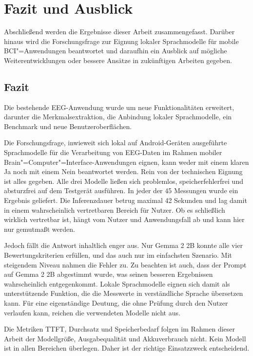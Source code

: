 \chapter{Fazit und Ausblick}
\label{ch:fazit}
Abschließend werden die Ergebnisse dieser Arbeit zusammengefasst. Darüber hinaus wird die Forschungsfrage zur Eignung lokaler Sprachmodelle für mobile \ac{BCI}"=Anwendungen beantwortet und daraufhin ein Ausblick auf mögliche Weiterentwicklungen oder bessere Ansätze in zukünftigen Arbeiten gegeben.

\section{Fazit}
\label{sec:fazit}
Die bestehende \ac{EEG}-Anwendung wurde um neue Funktionalitäten erweitert, darunter die Merkmalsextraktion, die Anbindung lokaler Sprachmodelle, ein Benchmark und neue Benutzeroberflächen.
\vspace{\baselineskip}

\noindent Die Forschungsfrage, inwieweit sich lokal auf Android-Geräten ausgeführte Sprachmodelle für die Verarbeitung von \ac{EEG}-Daten im Rahmen mobiler Brain"=Computer"=Interface-Anwendungen eignen, kann weder mit einem klaren Ja noch mit einem Nein beantwortet werden. Rein von der technischen Eignung ist alles gegeben. Alle drei Modelle ließen sich problemlos, speicherfehlerfrei und absturzfrei auf dem Testgerät ausführen. In jeder der 45 Messungen wurde ein Ergebnis geliefert. Die Inferenzdauer betrug maximal 42 Sekunden und lag damit in einem wahrscheinlich vertretbaren Bereich für Nutzer. Ob es schließlich wirklich vertretbar ist, hängt vom Nutzer und Anwendungsfall ab und kann hier nur gemutmaßt werden.
\vspace{\baselineskip}

\noindent Jedoch fällt die Antwort inhaltlich enger aus. Nur Gemma 2 2B konnte alle vier Bewertungskriterien erfüllen, und das auch nur im einfachsten Szenario. Mit steigendem Niveau nahmen die Fehler zu. Zu beachten ist auch, dass der Prompt auf Gemma 2 2B abgestimmt wurde, was seinen besseren Ergebnissen wahrscheinlich entgegenkommt. Lokale Sprachmodelle eignen sich damit als unterstützende Funktion, die die Messwerte in verständliche Sprache übersetzen kann. Für eine eigenständige Deutung, die ohne Prüfung durch den Nutzer verlaufen kann, reichen die verwendeten Modelle nicht aus.
\vspace{\baselineskip}

\noindent Die Metriken \ac{TTFT}, Durchsatz und Speicherbedarf folgen im Rahmen dieser Arbeit der Modellgröße, Ausgabequalität und Akkuverbrauch nicht. Kein Modell ist in allen Bereichen überlegen. Daher ist der richtige Einsatzzweck entscheidend.
\vspace{\baselineskip}

